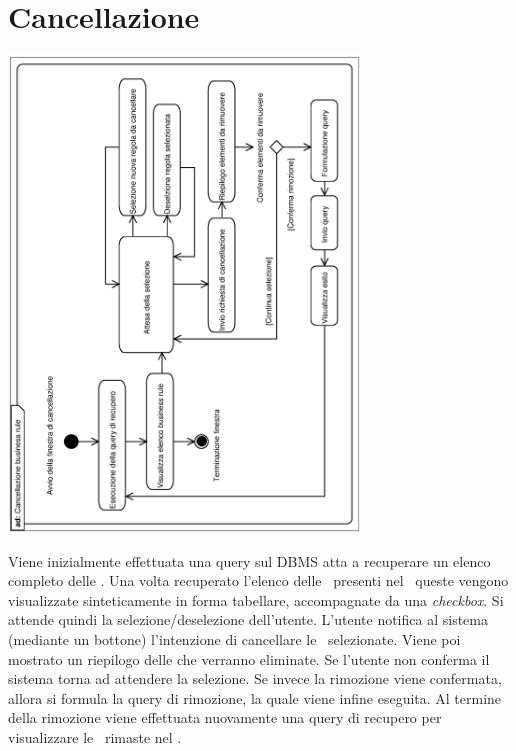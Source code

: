 \documentclass[11pt,titlepage,a4paper]{report}
\begin{document}
\section{Cancellazione \br}
\begin{center}
 \includegraphics[width=0.7\textwidth, angle=-90]{CancellazioneBusinessRule.eps}
\end{center}
Viene inizialmente effettuata una query sul DBMS atta a recuperare un elenco completo delle \brs. Una volta recuperato l'elenco delle \brs\ presenti nel \re\ queste vengono visualizzate sinteticamente in forma tabellare, accompagnate da una \textit{checkbox}. Si attende quindi la selezione/deselezione dell'utente. L'utente notifica al sistema (mediante un bottone) l'intenzione di cancellare le \brs\ selezionate.  Viene poi mostrato un riepilogo delle \brs che verranno eliminate. Se l'utente non conferma il sistema torna ad attendere la selezione. Se invece la rimozione viene confermata, allora si formula la query di rimozione, la quale viene infine eseguita. Al termine della rimozione viene effettuata nuovamente una query di recupero per visualizzare le \brs\ rimaste nel \re.


\end{document}
